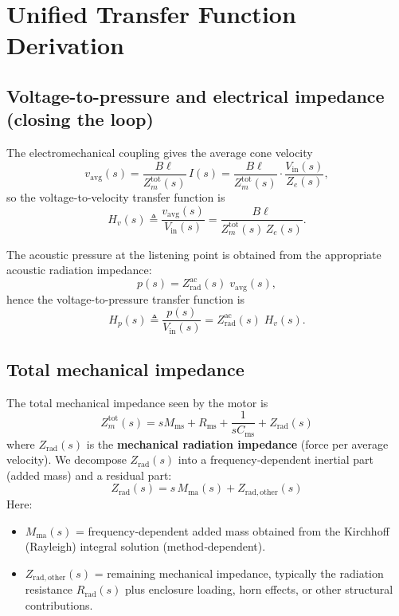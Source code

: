 \newpage
\section{Unified Transfer Function Derivation}

\subsection{Voltage-to-pressure and electrical impedance (closing the loop)}

The electromechanical coupling gives the average cone velocity
\[
v_{\mathrm{avg}}(s)=\frac{B\ell}{Z_m^{\mathrm{tot}}(s)}\,I(s)
=\frac{B\ell}{Z_m^{\mathrm{tot}}(s)}\cdot\frac{V_{\mathrm{in}}(s)}{Z_e(s)},
\]
so the voltage-to-velocity transfer function is
\[
H_v(s)\triangleq\frac{v_{\mathrm{avg}}(s)}{V_{\mathrm{in}}(s)}=\frac{B\ell}{Z_m^{\mathrm{tot}}(s)\,Z_e(s)}.
\]

The acoustic pressure at the listening point is obtained from the appropriate acoustic radiation impedance:
\[
p(s)=Z_{\mathrm{rad}}^{\mathrm{ac}}(s)\;v_{\mathrm{avg}}(s),
\]
hence the voltage-to-pressure transfer function is
\[
H_p(s)\triangleq\frac{p(s)}{V_{\mathrm{in}}(s)}=Z_{\mathrm{rad}}^{\mathrm{ac}}(s)\;H_v(s).
\]

\subsection{Total mechanical impedance}

The total mechanical impedance seen by the motor is
\[
\boxed{
Z_m^{\mathrm{tot}}(s)= sM_{\mathrm{ms}} + R_{\mathrm{ms}} + \frac{1}{sC_{\mathrm{ms}}} + Z_{\mathrm{rad}}(s)
}
\]
where \(Z_{\mathrm{rad}}(s)\) is the \textbf{mechanical radiation impedance} (force per average velocity).  
We decompose \(Z_{\mathrm{rad}}(s)\) into a frequency‑dependent inertial part (added mass) and a residual part:
\[
\boxed{
Z_{\mathrm{rad}}(s) = s\,M_{\mathrm{ma}}(s) + Z_{\mathrm{rad,other}}(s)
}
\]
Here:
\begin{itemize}
  \item \(M_{\mathrm{ma}}(s)\) = frequency‑dependent added mass obtained from the Kirchhoff (Rayleigh) integral solution (method‑dependent).
  \item \(Z_{\mathrm{rad,other}}(s)\) = remaining mechanical impedance, typically the radiation resistance \(R_{\mathrm{rad}}(s)\) plus enclosure loading, horn effects, or other structural contributions.
\end{itemize}

